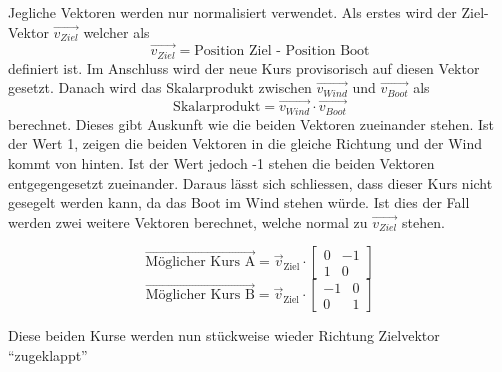 Jegliche Vektoren werden nur normalisiert verwendet. Als erstes wird der Ziel-Vektor $\Vec{v_{Ziel}}$ welcher als $$\Vec{v_{Ziel}} = \text{Position Ziel - Position Boot}$$ definiert ist. Im Anschluss wird der neue Kurs provisorisch auf diesen Vektor gesetzt.
Danach wird das Skalarprodukt zwischen $\Vec{v_{Wind}}$ und $\Vec{v_{Boot}}$ als $$\text{Skalarprodukt} = \Vec{v_{Wind}} \cdot \Vec{v_{Boot}}$$ berechnet. Dieses gibt Auskunft wie die beiden Vektoren zueinander stehen. Ist der Wert 1, zeigen die beiden Vektoren in die gleiche Richtung und der Wind kommt von hinten. Ist der Wert jedoch -1 stehen die beiden Vektoren entgegengesetzt zueinander. Daraus lässt sich schliessen, dass dieser Kurs nicht gesegelt werden kann, da das Boot im Wind stehen würde. Ist dies der Fall werden zwei weitere Vektoren berechnet, welche normal zu $\Vec{v_{Ziel}}$ stehen. 

$$\vec{\text{Möglicher Kurs A}} = \vec{v}_{\text{Ziel}}  \cdot \begin{bmatrix}0 & -1 \\ 1 & 0\end{bmatrix} $$
$$\vec{\text{Möglicher Kurs B}} = \vec{v}_{\text{Ziel}} \cdot \begin{bmatrix}-1 & 0 \\ 0 & 1\end{bmatrix} $$

Diese beiden Kurse werden nun stückweise wieder Richtung Zielvektor \enquote{zugeklappt} 

